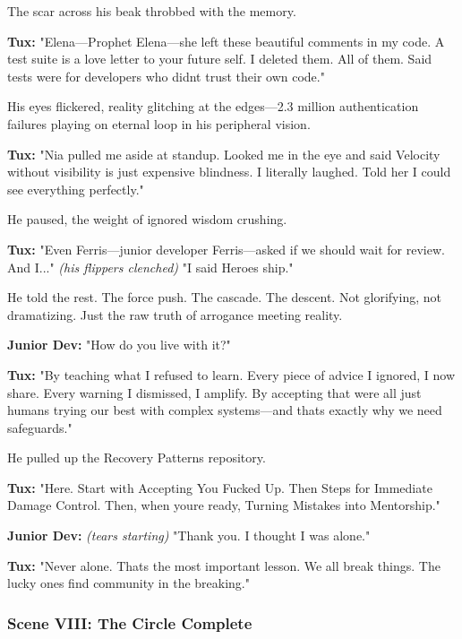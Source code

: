 The scar across his beak throbbed with the memory.

\textbf{Tux:} "Elena---Prophet Elena---she left these beautiful comments in my code. \textquotesingle A test suite is a love letter to your future self.\textquotesingle{} I deleted them. All of them. Said tests were for developers who didn\textquotesingle t trust their own code."

His eyes flickered, reality glitching at the edges---2.3 million authentication failures playing on eternal loop in his peripheral vision.

\textbf{Tux:} "Nia pulled me aside at standup. Looked me in the eye and said \textquotesingle Velocity without visibility is just expensive blindness.\textquotesingle{} I literally laughed. Told her I could see everything perfectly."

He paused, the weight of ignored wisdom crushing.

\textbf{Tux:} "Even Ferris---junior developer Ferris---asked if we should wait for review. And I..." \emph{(his flippers clenched)} "I said \textquotesingle Heroes ship.\textquotesingle"

He told the rest. The force push. The cascade. The descent. Not glorifying, not dramatizing. Just the raw truth of arrogance meeting reality.

\textbf{Junior Dev:} "How do you live with it?"

\textbf{Tux:} "By teaching what I refused to learn. Every piece of advice I ignored, I now share. Every warning I dismissed, I amplify. By accepting that we\textquotesingle re all just humans trying our best with complex systems---and that\textquotesingle s exactly why we need safeguards."

He pulled up the Recovery Patterns repository.

\textbf{Tux:} "Here. Start with \textquotesingle Accepting You Fucked Up.\textquotesingle{} Then \textquotesingle Steps for Immediate Damage Control.\textquotesingle{} Then, when you\textquotesingle re ready, \textquotesingle Turning Mistakes into Mentorship.\textquotesingle"

\textbf{Junior Dev:} \emph{(tears starting)} "Thank you. I thought I was alone."

\textbf{Tux:} "Never alone. That\textquotesingle s the most important lesson. We all break things. The lucky ones find community in the breaking."

\bookdivider

\subsubsection{Scene VIII: The Circle Complete}\label{scene-viii-the-circle-complete}

